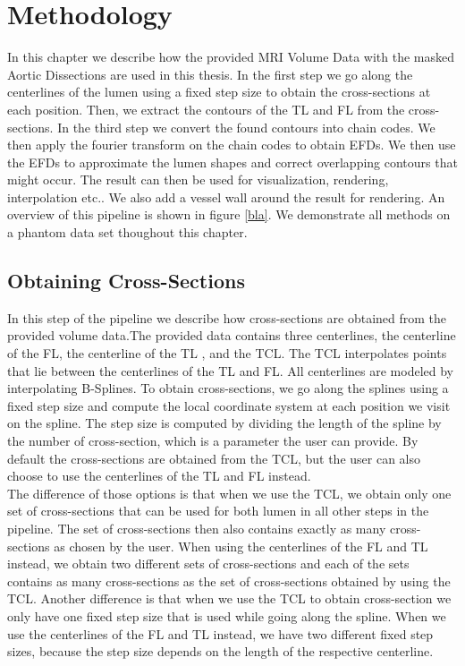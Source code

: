 \documentclass[thesis.tex]{subfiles}
\begin{document}
\chapter{Methodology}\label{chap:basics}

In this chapter we describe how the provided MRI Volume Data with the masked Aortic Dissections are used in this thesis. In the first step we go along the centerlines of the lumen using a fixed step size to obtain the cross-sections at each position. Then, we extract the contours of the TL and FL from the cross-sections. In the third step we convert the found contours into chain codes. We then apply the fourier transform on the chain codes to obtain EFDs. We then use the EFDs to approximate the lumen shapes and correct overlapping contours that might occur. The result can then be used for visualization, rendering, interpolation etc.. We also add a vessel wall around the result for rendering. An overview of this pipeline is shown in figure \ref{bla}. We demonstrate all methods on a phantom data set thoughout this chapter. 

\section{Obtaining Cross-Sections}
In this step of the pipeline we describe how cross-sections are obtained from the provided volume data.The provided data contains three centerlines, the centerline of the FL, the centerline of the TL , and the TCL. The TCL interpolates points that lie between the centerlines of the TL and FL. All centerlines are modeled by interpolating B-Splines. To obtain cross-sections, we go along the splines using a fixed step size and compute the local coordinate system at each position we visit on the spline. The step size is computed by dividing the length of the spline by the number of cross-section, which is a parameter the user can provide.
By default the cross-sections are obtained from the TCL, but the user can also choose to use the centerlines of the TL and FL instead. \\
The difference of those options is that when we use the TCL, we obtain only one set of cross-sections that can be used for both lumen in all other steps in the pipeline. The set of cross-sections then also contains exactly as many cross-sections as chosen by the user. When using the centerlines of the FL and TL instead, we obtain two different sets of cross-sections and each of the sets contains as many cross-sections as the set of cross-sections obtained by using the TCL. Another difference is that when we use the TCL to obtain cross-section we only have one fixed step size that is used while going along the spline. When we use the centerlines of the FL and TL instead, we have two different fixed step sizes, because the step size depends on the length of the respective centerline.
\end{document}
